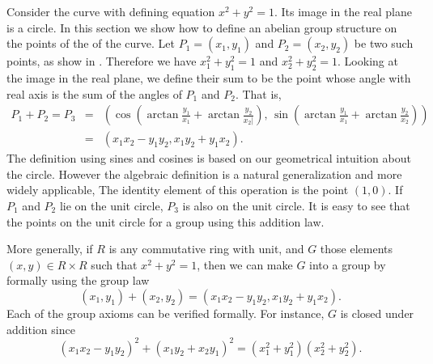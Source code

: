 Consider the curve with defining equation $x^2 + y^2 =1$.  Its image
in the real plane is a circle.  In this section we show how to define
an abelian group structure on the points of the of the curve.  Let
$P_1 = (x_1, y_1)$ and $P_2 = (x_2, y_2)$ be two such points, as show
in .  Therefore we have $x_1^2 + y_1^2 = 1$
and $x_2^2 + y_2^2 = 1$.  Looking at the image in the real plane, we
define their sum to be the point whose angle with real axis is the sum
of the angles of $P_1$ and $P_2$.  That is,
\begin{eqnarray*}
P_1 + P_2 = P_3 &= &
(\cos (\arctan {\frac{y_1}{x_1}} + \arctan {\frac{y_2}{x_2|}}),\,
\sin (\arctan {\frac{y_1}{x_1}} + \arctan {\frac{y_2}{x_2}}))\\
&=& (x_1 x_2 - y_1 y_2, x_1 y_2 + y_1 x_2).
\end{eqnarray*}
The definition using sines and cosines is based on our geometrical
intuition about the circle.  However the algebraic definition is a
natural generalization and more widely applicable, The identity element
of this operation is the point $(1, 0)$.  If $P_1$ and $P_2$ lie on the
unit circle, $P_3$ is also on the unit circle.  It is easy to see that
the points on the unit circle for a group using this addition law.

More generally, if $R$ is any commutative ring with unit, and $G$ those
elements $(x, y) \in R \times R$ such that $x^2 + y^2 = 1$, then we can
make $G$ into a group by formally using the group law
\[
(x_1, y_1) + (x_2, y_2) = (x_1 x_2 - y_1 y_2, x_1 y_2 + y_1 x_2).
\]
Each of the group axioms can be verified formally.  For instance, $G$ is
closed under addition since
\[
(x_1 x_2 - y_1 y_2)^2 + (x_1 y_2 + x_2 y_1)^2 
= (x_1^2 + y_1^2) (x_2^2 + y_2^2).
\]


